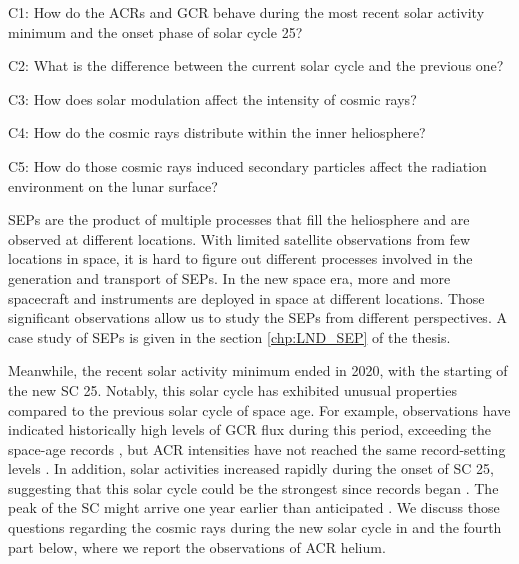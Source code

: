
\begin{tcolorbox}[colback=blue!5!white,colframe=blue!75!black,title=Scientific questions - cosmic rays]
	C1: How do the \acp{ACR} and \ac{GCR} behave during the most recent solar activity minimum and the onset phase of solar cycle 25? \\ \hfill

	C2: What is the difference between the current solar cycle and the previous one?\\ 
	\hfill

	C3: How does solar modulation affect the intensity of cosmic rays?  \\
	\hfill

	C4: How do the cosmic rays distribute within the inner heliosphere?  \\
	\hfill

C5: How do those cosmic rays induced secondary particles affect the radiation environment on the lunar surface?
\end{tcolorbox}
	

\acp{SEP} are the product of multiple processes that fill the heliosphere and are observed at different locations. With limited satellite observations from few locations in space, it is hard to figure out different processes involved in the generation and transport of \acp{SEP}. In the new space era, more and more spacecraft and instruments are deployed in space at different locations. Those significant observations allow us to study the \acp{SEP} from different perspectives. A case study of \acp{SEP} is given in the section \ref{chp:LND_SEP} of the thesis.

Meanwhile, the recent solar activity minimum ended in 2020, with the starting of the new \ac{SC} 25. Notably, this solar cycle has exhibited unusual properties compared to the previous solar cycle of space age. For example, observations have indicated historically high levels of \ac{GCR} flux during this period, exceeding the space-age records \citep{Fu2021ApJS, Xu2022FrASS}, but \ac{ACR} intensities have not reached the same record-setting levels \citep{Strauss2023ApJ}. 
In addition, solar activities increased rapidly during the onset of \ac{SC} 25, suggesting that this solar cycle could be the strongest since records began \citep{Nagovitsyn2023SoPh}. The peak of the \ac{SC} might arrive one year earlier than anticipated \citep{Prasad2023SoPh,McIntosh2020SoPh}. 
We discuss those questions regarding the cosmic rays during the new solar cycle in \citet{Xu2022FrASS,Mason-2021-SolOQuietTime} and the fourth part below, where we report the observations of \ac{ACR} helium.



